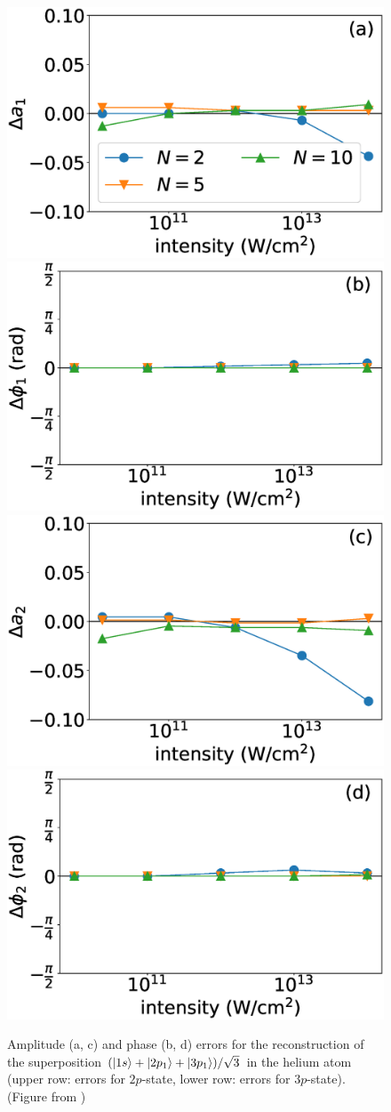 \begin{figure}[!ht]
\centering
\includegraphics[width=0.48\linewidth]{figs/Photo_ionization/superpositions/Venzke_new_fig_10a.eps}
\includegraphics[width=0.48\linewidth]{figs/Photo_ionization/superpositions/Venzke_new_fig_10b.eps}\\
\includegraphics[width=0.48\linewidth]{figs/Photo_ionization/superpositions/Venzke_new_fig_10c.eps}
\includegraphics[width=0.48\linewidth]{figs/Photo_ionization/superpositions/Venzke_new_fig_10d.eps}

\caption{
Amplitude (a, c) and phase (b, d) errors for the reconstruction of the superposition $(\ket{1s}+\ket{2p_1}+\ket{3p_1})/\sqrt{3}$ in the helium atom (upper row: errors for $2p$-state, lower row: errors for $3p$-state).  (Figure from \cite{venzke2021_wave})
} 
  \label{fig:3-state}
\end{figure}

